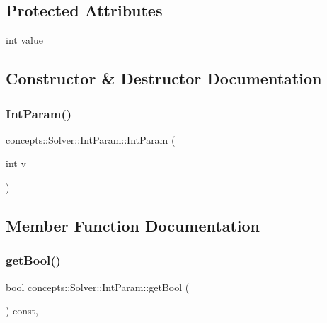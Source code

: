 \subsection*{Protected Attributes}
\begin{DoxyCompactItemize}
\item 
int \hyperlink{classconcepts_1_1_solver_1_1_int_param_a54714a8509c12174fdd81a92d3ed63d5}{value}
\end{DoxyCompactItemize}


\subsection{Constructor \& Destructor Documentation}
\mbox{\label{classconcepts_1_1_solver_1_1_int_param_ae0ca602547edf8a03c323f6bd93e332e}} 
\subsubsection{\texorpdfstring{Int\+Param()}{IntParam()}}
{\footnotesize\ttfamily concepts\+::\+Solver\+::\+Int\+Param\+::\+Int\+Param (\begin{DoxyParamCaption}\item[{int}]{v }\end{DoxyParamCaption})\hspace{0.3cm}{\ttfamily [inline]}}



\subsection{Member Function Documentation}
\mbox{\label{classconcepts_1_1_solver_1_1_int_param_aa991108bd194ff4f9cb21230549a74f5}} 
\subsubsection{\texorpdfstring{get\+Bool()}{getBool()}}
{\footnotesize\ttfamily bool concepts\+::\+Solver\+::\+Int\+Param\+::get\+Bool (\begin{DoxyParamCaption}{ }\end{DoxyParamCaption}) const\hspace{0.3cm}{\ttfamily [inline]}, {\ttfamily [virtual]}}



